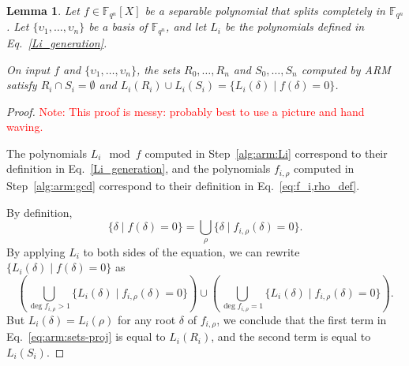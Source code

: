 \documentclass{article}
\newcommand{\ff}[1]{\mathbb{F}_{#1}}
\newcommand{\qq}{q}
\newcommand{\nn}{n}
\newcommand{\qn}{{\qq^\nn}}
\newcommand{\extf}{\ff{\qn}}
\newtheorem{Lem}{Lemma}
\newcommand{\Notes}[1]{\textcolor{red}{Note: #1}}
\begin{document}
\begin{Lem}
  \label{th:arm:lemma}
  Let $f\in\extf[X]$ be a separable polynomial that splits completely
  in $\extf$. Let $\{\upsilon_1,\dots,\upsilon_n\}$ be a basis of
  $\extf$, and let $L_i$ be the polynomials defined in
  Eq.~\eqref{Li_generation}.

  On input $f$ and $\{\upsilon_1,\dots,\upsilon_n\}$, the sets
  $R_0,\dots,R_n$ and $S_0,\dots,S_n$ computed by ARM satisfy
  $R_i\cap S_i = \emptyset$ and
  $L_i(R_i)\cup L_i(S_i) = \{L_i(\delta) \mid f(\delta) = 0\}$.
\end{Lem}
\begin{proof}
  \Notes{This proof is messy: probably best to use a picture and hand
    waving.}
  
  The polynomials $L_i\mod f$ computed in Step~\ref{alg:arm:Li}
  correspond to their definition in Eq.~\eqref{Li_generation}, and the
  polynomials $f_{i,\rho}$ computed in Step~\ref{alg:arm:gcd}
  correspond to their definition in Eq.~\eqref{eq:f_i,rho_def}.

  By definition, 
  \begin{equation}
    \label{eq:arm:sets}
    \{\delta \mid f(\delta) = 0\} = \bigcup_\rho \{\delta \mid
    f_{i,\rho}(\delta) = 0\}.
  \end{equation}
  By applying $L_i$ to both sides of the equation, we can rewrite
  $\{L_i(\delta) \mid f(\delta) = 0\}$ as
  \begin{equation}
    \label{eq:arm:sets-proj}
    \left(\bigcup_{\deg f_{i,\rho}>1}\{L_i(\delta)\mid f_{i,\rho}(\delta) = 0\}\right) \cup
    \left(\bigcup_{\deg f_{i,\rho}=1}\{L_i(\delta)\mid
      f_{i,\rho}(\delta) = 0\}\right).
  \end{equation}
  But $L_i(\delta)=L_i(\rho)$ for any root $\delta$ of $f_{i,\rho}$,
  we conclude that the first term in Eq.~\eqref{eq:arm:sets-proj} is
  equal to $L_i(R_i)$, and the second term is equal to $L_i(S_i)$.
\end{proof}
\end{document}
